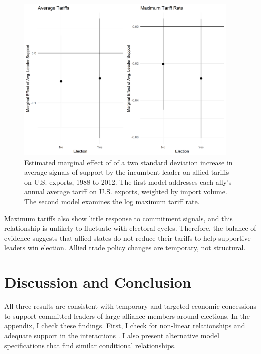 \documentclass[12pt]{article}
\begin{document}
\begin{figure}[htpb]
	\centering
		\includegraphics[width=0.95\textwidth]{../figures/tariff-me.png}
	\caption{Estimated marginal effect of of a two standard deviation increase in average signals of support by the incumbent leader on allied tariffs on U.S. exports, 1988 to 2012. The first model addresses each ally's annual average tariff on U.S. exports, weighted by import volume. The second model examines the log maximum tariff rate.}
	\label{fig:tariff-me}
\end{figure}


Maximum tariffs also show little response to commitment signals, and this relationship is unlikely to fluctuate with electoral cycles.
Therefore, the balance of evidence suggests that allied states do not reduce their tariffs to help supportive leaders win election.
Allied trade policy changes are temporary, not structural.


\section{Discussion and Conclusion}


All three results are consistent with temporary and targeted economic concessions to support committed leaders of large alliance members around elections. 
In the appendix, I check these findings.
First, I check for non-linear relationships and adequate support in the interactions \citep{Hainmuelleretal2019}. 
I also present alternative model specifications that find similar conditional relationships.
\end{document}
